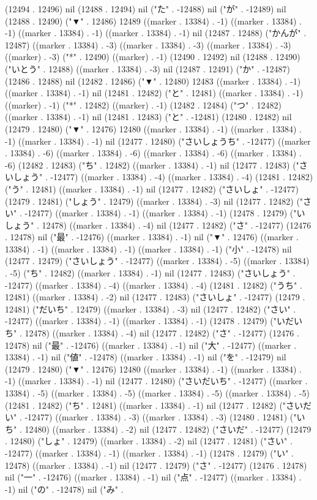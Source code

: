 (12494 . 12496) nil (12488 . 12494) nil ("た" . -12488) nil ("が" . -12489) nil (12488 . 12490) ("▼" . 12486) 12489 ((marker . 13384) . -1) ((marker . 13384) . -1) ((marker . 13384) . -1) ((marker . 13384) . -1) nil (12487 . 12488) ("かんが" . 12487) ((marker . 13384) . -3) ((marker . 13384) . -3) ((marker . 13384) . -3) ((marker) . -3) ("*" . 12490) ((marker) . -1) (12490 . 12492) nil (12488 . 12490) ("いとう" . 12488) ((marker . 13384) . -3) nil (12487 . 12491) ("か" . -12487) (12486 . 12488) nil (12482 . 12486) ("▼" . 12480) 12483 ((marker . 13384) . -1) ((marker . 13384) . -1) nil (12481 . 12482) ("と" . 12481) ((marker . 13384) . -1) ((marker) . -1) ("*" . 12482) ((marker) . -1) (12482 . 12484) ("つ" . 12482) ((marker . 13384) . -1) nil (12481 . 12483) ("と" . -12481) (12480 . 12482) nil (12479 . 12480) ("▼" . 12476) 12480 ((marker . 13384) . -1) ((marker . 13384) . -1) ((marker . 13384) . -1) nil (12477 . 12480) ("さいしょうち" . -12477) ((marker . 13384) . -6) ((marker . 13384) . -6) ((marker . 13384) . -6) ((marker . 13384) . -6) (12482 . 12483) ("ち" . 12482) ((marker . 13384) . -1) nil (12477 . 12483) ("さいしょう" . -12477) ((marker . 13384) . -4) ((marker . 13384) . -4) (12481 . 12482) ("う" . 12481) ((marker . 13384) . -1) nil (12477 . 12482) ("さいしょ" . -12477) (12479 . 12481) ("しょう" . 12479) ((marker . 13384) . -3) nil (12477 . 12482) ("さい" . -12477) ((marker . 13384) . -1) ((marker . 13384) . -1) (12478 . 12479) ("いしょう" . 12478) ((marker . 13384) . -4) nil (12477 . 12482) ("さ" . -12477) (12476 . 12478) nil ("最" . -12476) ((marker . 13384) . -1) nil ("▼" . 12476) ((marker . 13384) . -1) ((marker . 13384) . -1) ((marker . 13384) . -1) ("小" . -12478) nil (12477 . 12479) ("さいしょう" . -12477) ((marker . 13384) . -5) ((marker . 13384) . -5) ("ち" . 12482) ((marker . 13384) . -1) nil (12477 . 12483) ("さいしょう" . -12477) ((marker . 13384) . -4) ((marker . 13384) . -4) (12481 . 12482) ("うち" . 12481) ((marker . 13384) . -2) nil (12477 . 12483) ("さいしょ" . -12477) (12479 . 12481) ("だいち" . 12479) ((marker . 13384) . -3) nil (12477 . 12482) ("さい" . -12477) ((marker . 13384) . -1) ((marker . 13384) . -1) (12478 . 12479) ("いだいち" . 12478) ((marker . 13384) . -4) nil (12477 . 12482) ("さ" . -12477) (12476 . 12478) nil ("最" . -12476) ((marker . 13384) . -1) nil ("大" . -12477) ((marker . 13384) . -1) nil ("値" . -12478) ((marker . 13384) . -1) nil ("を" . -12479) nil (12479 . 12480) ("▼" . 12476) 12480 ((marker . 13384) . -1) ((marker . 13384) . -1) ((marker . 13384) . -1) nil (12477 . 12480) ("さいだいち" . -12477) ((marker . 13384) . -5) ((marker . 13384) . -5) ((marker . 13384) . -5) ((marker . 13384) . -5) (12481 . 12482) ("ち" . 12481) ((marker . 13384) . -1) nil (12477 . 12482) ("さいだい" . -12477) ((marker . 13384) . -3) ((marker . 13384) . -3) (12480 . 12481) ("いち" . 12480) ((marker . 13384) . -2) nil (12477 . 12482) ("さいだ" . -12477) (12479 . 12480) ("しょ" . 12479) ((marker . 13384) . -2) nil (12477 . 12481) ("さい" . -12477) ((marker . 13384) . -1) ((marker . 13384) . -1) (12478 . 12479) ("い" . 12478) ((marker . 13384) . -1) nil (12477 . 12479) ("さ" . -12477) (12476 . 12478) nil ("一" . -12476) ((marker . 13384) . -1) nil ("点" . -12477) ((marker . 13384) . -1) nil ("の" . -12478) nil ("み" . 